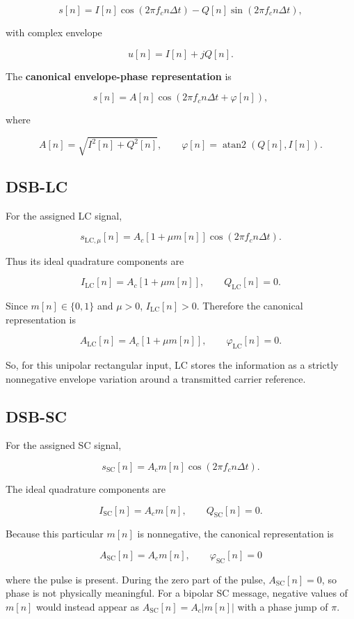 \documentclass[11pt]{article}
\begin{document}
\[
s[n]=I[n]\cos(2\pi f_c n\Delta t)-Q[n]\sin(2\pi f_c n\Delta t),
\]

with complex envelope

\[
u[n]=I[n]+jQ[n].
\]

The \textbf{canonical envelope-phase representation} is

\[
s[n]=A[n]\cos(2\pi f_c n\Delta t+\varphi[n]),
\]

where

\[
A[n]=\sqrt{I^2[n]+Q^2[n]},
\qquad
\varphi[n]=\operatorname{atan2}(Q[n],I[n]).
\]

\subsection{DSB-LC}

For the assigned LC signal,

\[
s_{\mathrm{LC},\mu}[n]=A_c\left[1+\mu m[n]\right]\cos(2\pi f_c n\Delta t).
\]

Thus its ideal quadrature components are

\[
I_{\mathrm{LC}}[n]=A_c\left[1+\mu m[n]\right],
\qquad
Q_{\mathrm{LC}}[n]=0.
\]

Since $m[n]\in\{0,1\}$ and $\mu>0$, $I_{\mathrm{LC}}[n]>0$. Therefore the canonical representation is

\[
A_{\mathrm{LC}}[n]=A_c\left[1+\mu m[n]\right],
\qquad
\varphi_{\mathrm{LC}}[n]=0.
\]

So, for this unipolar rectangular input, LC stores the information as a strictly nonnegative envelope variation around a transmitted carrier reference.

\subsection{DSB-SC}

For the assigned SC signal,

\[
s_{\mathrm{SC}}[n]=A_c m[n]\cos(2\pi f_c n\Delta t).
\]

The ideal quadrature components are

\[
I_{\mathrm{SC}}[n]=A_c m[n],
\qquad
Q_{\mathrm{SC}}[n]=0.
\]

Because this particular $m[n]$ is nonnegative, the canonical representation is

\[
A_{\mathrm{SC}}[n]=A_c m[n],
\qquad
\varphi_{\mathrm{SC}}[n]=0
\]

where the pulse is present. During the zero part of the pulse, $A_{\mathrm{SC}}[n]=0$, so phase is not physically meaningful. For a bipolar SC message, negative values of $m[n]$ would instead appear as $A_{\mathrm{SC}}[n]=A_c|m[n]|$ with a phase jump of $\pi$.
\end{document}
